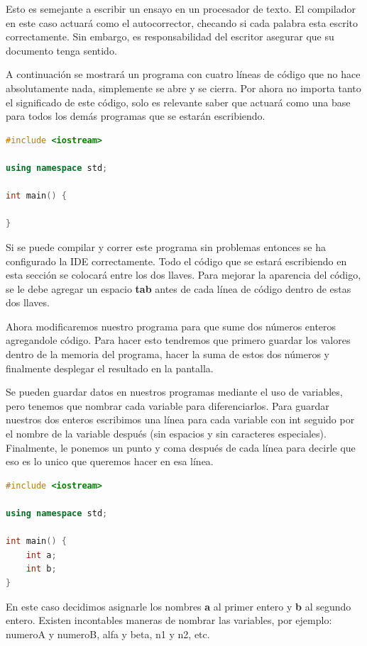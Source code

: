 \documentclass{article}
\begin{document}
Esto es semejante a escribir un ensayo en un procesador de texto. El compilador en este caso actuará como el autocorrector, checando si cada palabra esta escrito correctamente. Sin embargo, es responsabilidad del escritor asegurar que su documento tenga sentido.

A continuación se mostrará un programa con cuatro líneas de código que no hace absolutamente nada, simplemente se abre y se cierra. Por ahora no importa tanto el significado de este código, solo es relevante saber que actuará como una base para todos los demás programas que se estarán escribiendo.

\begin{lstlisting}[language=C++, caption=Las cuatro líneas esenciales]
#include <iostream>

using namespace std;

int main() {

}
\end{lstlisting}

Si se puede compilar y correr este programa sin problemas entonces se ha configurado la IDE correctamente. Todo el código que se estará escribiendo en esta sección se colocará entre los dos llaves. Para mejorar la aparencia del código, se le debe agregar un espacio \textbf{tab} antes de cada línea de código dentro de estas dos llaves.

Ahora modificaremos nuestro programa para que sume dos números enteros agregandole código. Para hacer esto tendremos que primero guardar los valores dentro de la memoria del programa, hacer la suma de estos dos números y finalmente desplegar el resultado en la pantalla.

Se pueden guardar datos en nuestros programas mediante el uso de variables, pero tenemos que nombrar cada variable para diferenciarlos. Para guardar nuestros dos enteros escribimos una línea para cada variable con int seguido por el nombre de la variable después (sin espacios y sin caracteres especiales). Finalmente, le ponemos un punto y coma después de cada línea para decirle que eso es lo unico que queremos hacer en esa línea.

\begin{lstlisting}[language=C++, caption=Dos variables]
#include <iostream>

using namespace std;

int main() {
    int a;
    int b;
}
\end{lstlisting}

En este caso decidimos asignarle los nombres \textbf{a} al primer entero y \textbf{b} al segundo entero. Existen incontables maneras de nombrar las variables, por ejemplo: numeroA y numeroB, alfa y beta, n1 y n2, etc.
\end{document}
